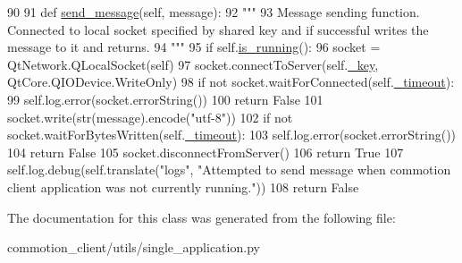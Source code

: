 \begin{DoxyCode}
90 
91     \textcolor{keyword}{def }\hyperlink{classcommotion__client_1_1utils_1_1single__application_1_1SingleApplicationWithMessaging_a07475e0643ef2f92a0e990e7feefa4e3}{send\_message}(self, message):
92         \textcolor{stringliteral}{"""}
93 \textcolor{stringliteral}{        Message sending function. Connected to local socket specified by shared key and if successful
       writes the message to it and returns.}
94 \textcolor{stringliteral}{        """}
95         \textcolor{keywordflow}{if} self.\hyperlink{classcommotion__client_1_1utils_1_1single__application_1_1SingleApplication_acf757577a5b8729d162c828275e1b948}{is\_running}():
96             socket = QtNetwork.QLocalSocket(self)
97             socket.connectToServer(self.\hyperlink{classcommotion__client_1_1utils_1_1single__application_1_1SingleApplication_a9c95e184472415ffd42cb82dcf14a332}{\_key}, QtCore.QIODevice.WriteOnly)
98             \textcolor{keywordflow}{if} \textcolor{keywordflow}{not} socket.waitForConnected(self.\hyperlink{classcommotion__client_1_1utils_1_1single__application_1_1SingleApplicationWithMessaging_ae4ca7cb1d3bf9e9ebc683c953c8c08f4}{\_timeout}):
99                 self.log.error(socket.errorString())
100                 \textcolor{keywordflow}{return} \textcolor{keyword}{False}
101             socket.write(str(message).encode(\textcolor{stringliteral}{"utf-8"}))
102             \textcolor{keywordflow}{if} \textcolor{keywordflow}{not} socket.waitForBytesWritten(self.\hyperlink{classcommotion__client_1_1utils_1_1single__application_1_1SingleApplicationWithMessaging_ae4ca7cb1d3bf9e9ebc683c953c8c08f4}{\_timeout}):
103                 self.log.error(socket.errorString())
104                 \textcolor{keywordflow}{return} \textcolor{keyword}{False}
105             socket.disconnectFromServer()
106             \textcolor{keywordflow}{return} \textcolor{keyword}{True}
107         self.log.debug(self.translate(\textcolor{stringliteral}{"logs"}, \textcolor{stringliteral}{"Attempted to send message when commotion client application
       was not currently running."}))
108         \textcolor{keywordflow}{return} \textcolor{keyword}{False}

\end{DoxyCode}


The documentation for this class was generated from the following file\-:\begin{DoxyCompactItemize}
\item 
commotion\-\_\-client/utils/single\-\_\-application.\-py\end{DoxyCompactItemize}
